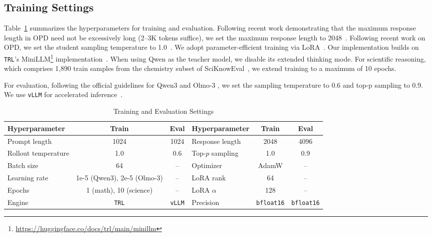 \documentclass{article}
\begin{document}
\subsection{Training Settings}
Table~\ref{tab:hyperparameters_all} summarizes the hyperparameters for training and evaluation.
Following recent work demonstrating that the maximum response length in OPD need not be excessively long (2--3K tokens suffice), we set the maximum response length to 2048~\citep{zhang2026prefixopd, li2026rethinkingopd}. Following recent work on OPD, we set the student sampling temperature to 1.0~\citep{li2026rethinkingopd,ko2026scaling}. We adopt parameter-efficient training via LoRA~\citep{hu2022lora}.
Our implementation builds on \texttt{TRL}'s MiniLLM\footnote{\url{https://huggingface.co/docs/trl/main/minillm}} implementation~\citep{vonwerra2020trl,gu2024minillm}. When using Qwen as the teacher model, we disable its extended thinking mode. For scientific reasoning, which comprises 1,890 train samples from the chemistry subset of SciKnowEval~\citep{feng2024sciknoweval}, we extend training to a maximum of 10 epochs.

For evaluation, following the official guidelines for Qwen3 and Olmo-3 \cite{yang2025qwen3, olmo2025olmo}, we set the sampling temperature to 0.6 and top-p sampling to 0.9. We use \texttt{vLLM} for accelerated inference~\citep{kwon2023efficient}.


\begin{table}[!h]
\centering
\caption{Training and Evaluation Settings}
\label{tab:hyperparameters_all}
\small
\setlength{\tabcolsep}{4pt}
\begin{tabular}{l|c|c||l|c|c}
\toprule
\textbf{Hyperparameter} & \textbf{Train} & \textbf{Eval}
& \textbf{Hyperparameter} & \textbf{Train} & \textbf{Eval} \\
\midrule
Prompt length   & 1024 & 1024
& Response length & 2048 & 4096 \\
Rollout temperature     & 1.0 & 0.6
& Top-$p$ sampling        & 1.0 & 0.9 \\
Batch size              & 64 & --
& Optimizer              & AdamW & -- \\
Learning rate           & 1e-5 (Qwen3), 2e-5 (Olmo-3) & --
& LoRA rank               & 64 & -- \\
Epochs                  & 1 (math), 10 (science) & --
& LoRA $\alpha$          & 128 & -- \\
Engine                  & \texttt{TRL} & \texttt{vLLM}
& Precision               & \texttt{bfloat16} & \texttt{bfloat16} \\
\bottomrule
\end{tabular}
\end{table}
\end{document}
